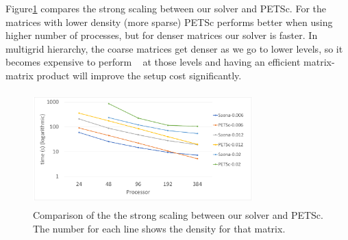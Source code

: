 Figure\ref{fig:petsc1} compares the strong scaling between our solver and PETSc. For the matrices with lower density (more sparse) PETSc performs better when using higher number of processes, but for denser matrices our solver is faster. In multigrid hierarchy, the coarse matrices get denser as we go to lower levels, so it becomes expensive to perform \mm~ at those levels and having an efficient matrix-matrix product will improve the setup cost significantly.

\begin{figure}[tbh]
 \centering
 \includegraphics[width=8.5cm,height=4.4cm]{./figures/petsc1.pdf}
 \caption{Comparison of the the strong scaling between our solver and PETSc. The number for each line shows the density for that matrix.}
 \label{fig:petsc1}
\end{figure}

